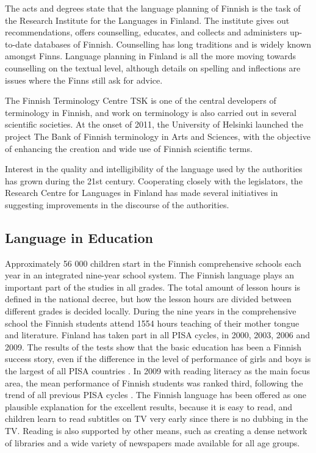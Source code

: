 \documentclass[]{../../metanetpaper}
\begin{document}
\begin{multicols}{2}
The acts and degrees state that the language planning of Finnish is the task of
the Research Institute for the Languages in Finland. The institute gives out
recommendations, offers counselling, educates, and collects and administers
up-to-date databases of Finnish. Counselling has long traditions and is widely
known amongst Finns. Language planning in Finland is all the more moving
towards counselling on the textual level, although details on spelling and
inflections are issues where the Finns still ask for advice.

The Finnish Terminology Centre TSK is one of the central developers of
terminology in Finnish, and work on terminology is also carried out in several
scientific societies. At the onset of 2011, the University of Helsinki launched
the project The Bank of Finnish terminology in Arts and Sciences, with the
objective of enhancing the creation and wide use of Finnish scientific terms.

Interest in the quality and intelligibility of the language used by the
authorities has grown during the 21st century. Cooperating closely with the
legislators, the Research Centre for Languages in Finland has made several
initiatives in suggesting improvements in the discourse of the authorities.

\subsection{Language in Education}


Approximately 56 000 children start in the Finnish comprehensive schools each
year in an integrated nine-year school system. The Finnish language plays an
important part of the studies in all grades. The total amount of lesson hours
is defined in the national decree, but how the lesson hours are divided between
different grades is decided locally. During the nine years in the comprehensive
school the Finnish students attend 1554 hours teaching of their mother tongue
and literature.
Finland has taken part in all PISA cycles, in 2000, 2003, 2006 and
2009. The results of the tests show that the basic education has been
a Finnish success story, even if the difference in the level of
performance of girls and boys is the largest of all PISA countries
\cite{Literacy}. In 2009 with reading literacy as the main focus area,
the mean performance of Finnish students was ranked third, following
the trend of all previous PISA cycles \cite{Pisa2006}. The Finnish
language has been offered as one plausible explanation for the
excellent results, because it is easy to read, and children learn to
read subtitles on TV very early since there is no dubbing in the
TV. Reading is also supported by other means, such as creating a dense network of
libraries and a wide variety of newspapers made available for all age
groups.


\end{multicols}
\end{document}
